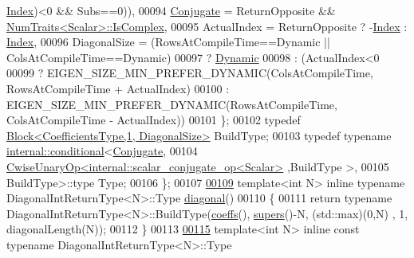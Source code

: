 \begin{DoxyCode}
      \hyperlink{group___core___module_a554f30542cc2316add4b1ea0a492ff02}{Index})<0 && Subs==0)),
00094         \hyperlink{class_eigen_1_1_conjugate}{Conjugate} = ReturnOpposite && \hyperlink{group___core___module_struct_eigen_1_1_num_traits}{NumTraits<Scalar>::IsComplex},
00095         ActualIndex = ReturnOpposite ? -\hyperlink{group___core___module_a554f30542cc2316add4b1ea0a492ff02}{Index} : \hyperlink{group___core___module_a554f30542cc2316add4b1ea0a492ff02}{Index},
00096         DiagonalSize = (RowsAtCompileTime==Dynamic || ColsAtCompileTime==Dynamic)
00097                      ? \hyperlink{namespace_eigen_ad81fa7195215a0ce30017dfac309f0b2}{Dynamic}
00098                      : (ActualIndex<0
00099                      ? EIGEN\_SIZE\_MIN\_PREFER\_DYNAMIC(ColsAtCompileTime, RowsAtCompileTime + ActualIndex)
00100                      : EIGEN\_SIZE\_MIN\_PREFER\_DYNAMIC(RowsAtCompileTime, ColsAtCompileTime - ActualIndex))
00101       \};
00102       \textcolor{keyword}{typedef} \hyperlink{group___core___module_class_eigen_1_1_block}{Block<CoefficientsType,1, DiagonalSize>} BuildType;
00103       \textcolor{keyword}{typedef} \textcolor{keyword}{typename} \hyperlink{struct_eigen_1_1internal_1_1conditional}{internal::conditional}<\hyperlink{class_eigen_1_1_conjugate}{Conjugate},
00104                  \hyperlink{group___core___module_class_eigen_1_1_cwise_unary_op}{CwiseUnaryOp<internal::scalar\_conjugate\_op<Scalar>}
      ,BuildType >,
00105                  BuildType>::type Type;
00106     \};
00107 
\hyperlink{class_eigen_1_1internal_1_1_band_matrix_base_a1d98143681d5c1e2709ce18332a939dc}{00109}     \textcolor{keyword}{template}<\textcolor{keywordtype}{int} N> \textcolor{keyword}{inline} \textcolor{keyword}{typename} DiagonalIntReturnType<N>::Type \hyperlink{class_eigen_1_1internal_1_1_band_matrix_base_a1d98143681d5c1e2709ce18332a939dc}{diagonal}()
00110     \{
00111       \textcolor{keywordflow}{return} \textcolor{keyword}{typename} DiagonalIntReturnType<N>::BuildType(\hyperlink{class_eigen_1_1internal_1_1_band_matrix_base_ab7c9e9a7ca5ad0f2f3a82ac582650499}{coeffs}(), \hyperlink{class_eigen_1_1internal_1_1_band_matrix_base_a58617da0d75d22b1f8dfdfde702ebb4a}{supers}()-N, (std::max)(0,N)
      , 1, diagonalLength(N));
00112     \}
00113 
\hyperlink{class_eigen_1_1internal_1_1_band_matrix_base_aa8a5c997afb4ebd9b43b9ff2e1078cf9}{00115}     \textcolor{keyword}{template}<\textcolor{keywordtype}{int} N> \textcolor{keyword}{inline} \textcolor{keyword}{const} \textcolor{keyword}{typename} DiagonalIntReturnType<N>::Type 

\end{DoxyCode}
